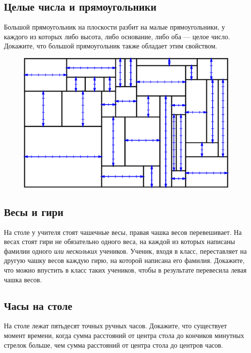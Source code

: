 \subsection*{Целые числа и прямоугольники} %

Большой прямоугольник на плоскости разбит на малые прямоугольники, у каждого из которых либо высота, либо основание, либо оба --- целое число. 
Докажите, что большой прямоугольник также обладает этим свойством.

\begin{figure}[h!]
\centering
\includegraphics[scale=0.5]{Figs/Insight/rect}
\end{figure}

\subsection*{Весы и гири} %

На столе у учителя стоят чашечные весы, правая чашка весов перевешивает.
На весах стоят гири не обязательно одного веса, на каждой из которых написаны фамилии одного \emph{или нескольких} учеников.
Ученик, входя в класс, переставляет на другую чашку весов каждую гирю, на которой написана его фамилия.
Докажите, что можно впустить в класс таких учеников, чтобы в результате перевесила левая чашка весов.

\subsection*{Часы на столе} %

На столе лежат пятьдесят точных ручных часов.
Докажите, что существует момент времени, когда сумма расстояний от центра стола до кончиков минутных стрелок больше, чем сумма расстояний от центра стола до центров часов.

